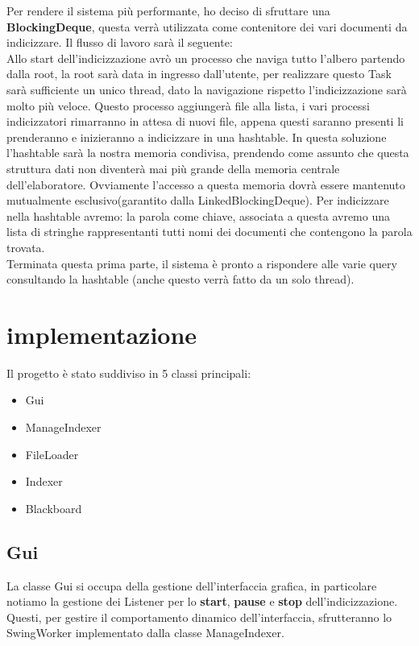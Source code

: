 \documentclass{article}
\begin{document}
Per rendere il sistema più performante, ho deciso di sfruttare una \textbf{BlockingDeque}, questa verrà utilizzata come contenitore dei vari documenti da indicizzare. Il flusso di lavoro sarà il seguente: \\
Allo start dell'indicizzazione avrò un processo che naviga tutto l'albero partendo dalla root, la root sarà data in ingresso dall'utente, per realizzare questo Task sarà sufficiente un unico thread, dato la navigazione rispetto l'indicizzazione sarà molto più veloce. Questo processo aggiungerà file alla lista, i vari processi indicizzatori rimarranno in attesa di nuovi file, appena questi saranno presenti li prenderanno e inizieranno a indicizzare in una hashtable. In questa soluzione l'hashtable sarà la nostra memoria condivisa, prendendo come assunto che questa struttura dati non diventerà mai più grande della memoria centrale dell'elaboratore. Ovviamente l'accesso a questa memoria dovrà essere mantenuto mutualmente esclusivo(garantito dalla LinkedBlockingDeque).
Per indicizzare nella hashtable avremo: la parola come chiave, associata a questa avremo una lista di stringhe rappresentanti tutti nomi dei documenti che contengono la parola trovata.\\
Terminata questa prima parte, il sistema è pronto a rispondere alle varie query consultando la hashtable (anche questo verrà fatto da un solo thread).

\section{implementazione}
Il progetto è stato suddiviso in 5 classi principali:
\begin{itemize}
  \item Gui
  \item ManageIndexer
  \item FileLoader
  \item Indexer
  \item Blackboard
\end{itemize}


\subsection{Gui}
La classe Gui si occupa della gestione dell'interfaccia grafica, in particolare notiamo la gestione dei Listener per lo \textbf{start}, \textbf{pause} e \textbf{stop} dell'indicizzazione. Questi, per gestire il comportamento dinamico dell'interfaccia, sfrutteranno lo SwingWorker implementato dalla classe ManageIndexer.
\end{document}
